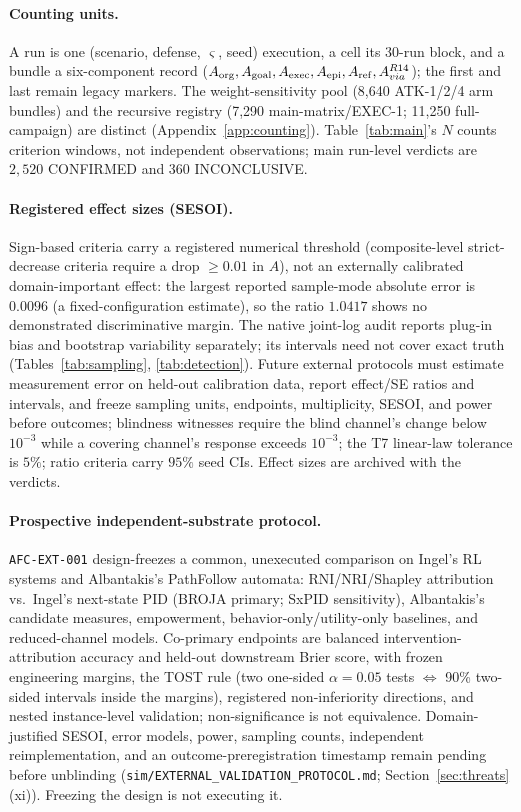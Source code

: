 \paragraph{Counting units.}
A run is one (scenario, defense, $\varsigma$, seed) execution, a cell its
30-run block, and a bundle a six-component record
($A_{\mathrm{org}},A_{\mathrm{goal}},A_{\mathrm{exec}},A_{\mathrm{epi}},A_{\mathrm{ref}},A_{via}^{R14}$); the first and last remain
legacy markers. The weight-sensitivity pool (8,640 ATK-1/2/4 arm bundles) and
the recursive registry (7,290 main-matrix/EXEC-1; 11,250 full-campaign) are
distinct (Appendix~\ref{app:counting}). Table~\ref{tab:main}'s $N$ counts
criterion windows, not independent observations; main run-level verdicts are
$2{,}520$ CONFIRMED and $360$ INCONCLUSIVE.

\paragraph{Registered effect sizes (SESOI).}
Sign-based criteria carry a registered numerical threshold (composite-level
strict-decrease criteria require a drop $\ge0.01$ in $A$), not an externally
calibrated domain-important effect: the largest reported sample-mode absolute
error is $0.0096$ (a fixed-configuration estimate), so the ratio $1.0417$
shows no demonstrated discriminative margin. The native joint-log audit
reports plug-in bias and bootstrap variability separately; its intervals need
not cover exact truth (Tables~\ref{tab:sampling}, \ref{tab:detection}). Future
external protocols must estimate measurement error on held-out calibration
data, report effect/SE ratios and intervals, and freeze sampling units,
endpoints, multiplicity, SESOI, and power before outcomes; blindness witnesses
require the blind channel's change below $10^{-3}$ while a covering channel's
response exceeds $10^{-3}$; the T7 linear-law tolerance is $5\%$; ratio
criteria carry $95\%$ seed CIs. Effect sizes are archived with the verdicts.

\paragraph{Prospective independent-substrate protocol.}
\texttt{AFC-EXT-001} design-freezes a common, unexecuted comparison on
Ingel's RL systems and Albantakis's PathFollow automata: RNI/NRI/Shapley
attribution vs.\ Ingel's next-state PID (BROJA primary; SxPID sensitivity),
Albantakis's candidate measures, empowerment, behavior-only/utility-only
baselines, and reduced-channel models. Co-primary endpoints are balanced
intervention-attribution accuracy and held-out downstream Brier score, with
frozen engineering margins, the TOST rule (two one-sided $\alpha=0.05$ tests
$\Leftrightarrow$ 90\% two-sided intervals inside the margins), registered
non-inferiority directions, and nested instance-level validation;
non-significance is not equivalence. Domain-justified SESOI, error models,
power, sampling counts, independent reimplementation, and an
outcome-preregistration timestamp remain pending before unblinding
(\texttt{sim/EXTERNAL\_VALIDATION\_PROTOCOL.md};
Section~\ref{sec:threats}(xi)). Freezing the design is not executing it.


